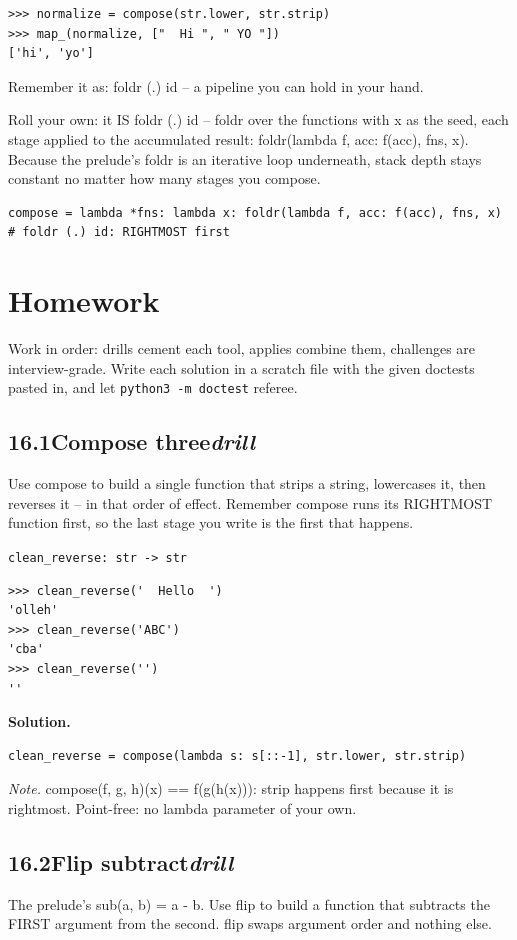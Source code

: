 \documentclass[10pt,letterpaper]{book}
\begin{document}
\begin{lstlisting}[style=ex]
>>> normalize = compose(str.lower, str.strip)
>>> map_(normalize, ["  Hi ", " YO "])
['hi', 'yo']
\end{lstlisting}

Remember it as: foldr (.) id -- a pipeline you can hold in your hand.


Roll your own: it IS foldr (.) id -- foldr over the functions with x as the seed, each stage applied to the accumulated result: foldr(lambda f, acc: f(acc), fns, x). Because the prelude's foldr is an iterative loop underneath, stack depth stays constant no matter how many stages you compose.

\begin{lstlisting}[style=ex]
compose = lambda *fns: lambda x: foldr(lambda f, acc: f(acc), fns, x)  # foldr (.) id: RIGHTMOST first
\end{lstlisting}
\section{Homework}
Work in order: drills cement each tool, applies combine them,
challenges are interview-grade. Write each solution in a scratch file with
the given doctests pasted in, and let \texttt{python3 -m doctest} referee.
\subsection*{16.1\quad Compose three\hfill\textnormal{\textit{drill}}}
Use compose to build a single function that strips a string, lowercases it, then reverses it -- in that order of effect. Remember compose runs its RIGHTMOST function first, so the last stage you write is the first that happens.

\noindent\texttt{clean\_reverse: str -> str}
\begin{lstlisting}[style=ex]
>>> clean_reverse('  Hello  ')
'olleh'
>>> clean_reverse('ABC')
'cba'
>>> clean_reverse('')
''
\end{lstlisting}
\noindent\textbf{Solution.}
\begin{lstlisting}[style=code]
clean_reverse = compose(lambda s: s[::-1], str.lower, str.strip)
\end{lstlisting}
\noindent\textit{Note.} compose(f, g, h)(x) == f(g(h(x))): strip happens first because it is rightmost. Point-free: no lambda parameter of your own.

\subsection*{16.2\quad Flip subtract\hfill\textnormal{\textit{drill}}}
The prelude's sub(a, b) = a - b. Use flip to build a function that subtracts the FIRST argument from the second. flip swaps argument order and nothing else.
\end{document}
